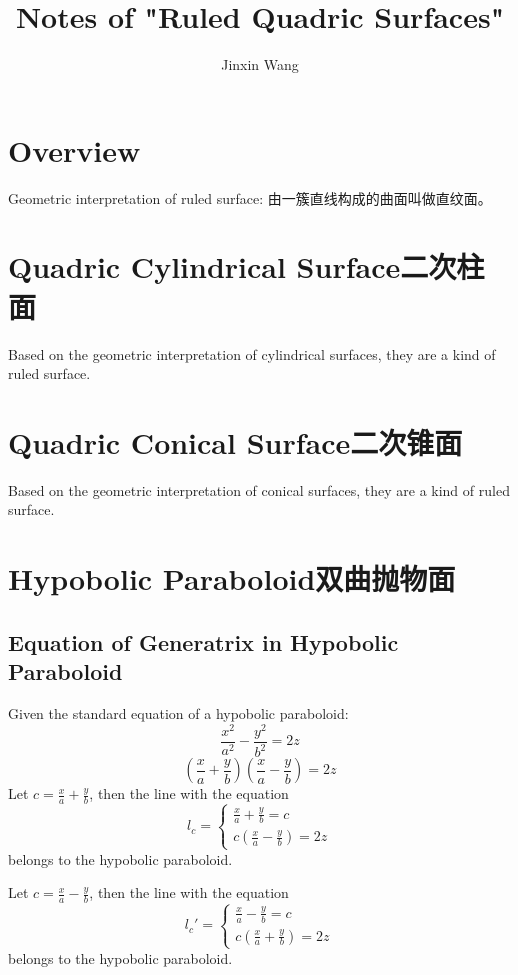\documentclass[onecolumn]{ctexart}
\title{Notes of "Ruled Quadric Surfaces"}
\author{Jinxin Wang}
\date{}
\begin{document}
\maketitle

\section{Overview}
Geometric interpretation of ruled surface: 由一簇直线构成的曲面叫做直纹面。

\section{Quadric Cylindrical Surface二次柱面}

Based on the geometric interpretation of cylindrical surfaces, they are a kind 
of ruled surface.

\section{Quadric Conical Surface二次锥面}

Based on the geometric interpretation of conical surfaces, they are a kind of 
ruled surface.

\section{Hypobolic Paraboloid双曲抛物面}

\subsection{Equation of Generatrix in Hypobolic Paraboloid}

Given the standard equation of a hypobolic paraboloid:
\begin{equation}
  \frac{x^2}{a^2} - \frac{y^2}{b^2} = 2z
\end{equation}
\[
  (\frac{x}{a} + \frac{y}{b})(\frac{x}{a} - \frac{y}{b}) = 2z
\]
Let $c = \frac{x}{a} + \frac{y}{b}$, then the line with the equation
\[
  l_c = 
  \begin{cases}
    \frac{x}{a} + \frac{y}{b} = c \\
    c(\frac{x}{a} - \frac{y}{b}) = 2z
  \end{cases}
\]
belongs to the hypobolic paraboloid.

Let $c = \frac{x}{a} - \frac{y}{b}$, then the line with the equation
\[
  l_c' = 
  \begin{cases}
    \frac{x}{a} - \frac{y}{b} = c \\
    c(\frac{x}{a} + \frac{y}{b}) = 2z
  \end{cases}
\]
belongs to the hypobolic paraboloid.
\end{document}
